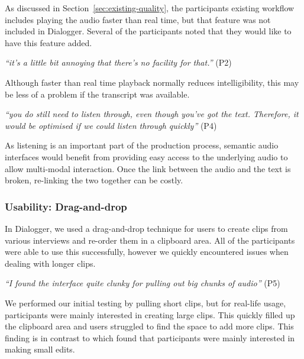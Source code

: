 As discussed in Section~\ref{sec:existing-quality}, the participants existing workflow includes playing the audio
faster than real time, but that feature was not included in Dialogger.  Several of the participants noted that they
would like to have this feature added.

\textit{``it's a little bit annoying that there's no facility for that.''} (P2)

Although faster than real time playback normally reduces intelligibility, this may be less of a problem if the
transcript was available.

\textit{``you do still need to listen through, even though you've got the text.  Therefore, it would be optimised if we
  could listen through quickly''} (P4)

As listening is an important part of the production process, semantic audio interfaces would benefit from providing
easy access to the underlying audio to allow multi-modal interaction. Once the link between the audio and the text is
broken, re-linking the two together can be costly.



\subsubsection{Usability: Drag-and-drop}

In Dialogger, we used a drag-and-drop technique for users to create clips from various interviews and
re-order them in a clipboard area. All of the participants were able to use this successfully, however we quickly
encountered issues when dealing with longer clips.

\textit{``I found the interface quite clunky for pulling out big chunks of audio''} (P5)

We performed our initial testing by pulling short clips, but for real-life usage, participants were mainly interested
in creating large clips. This quickly filled up the clipboard area and users struggled to find the space to add more
clips. This finding is in contrast to \citet{Sivaraman2016} which found that participants were mainly interested in
making small edits.

